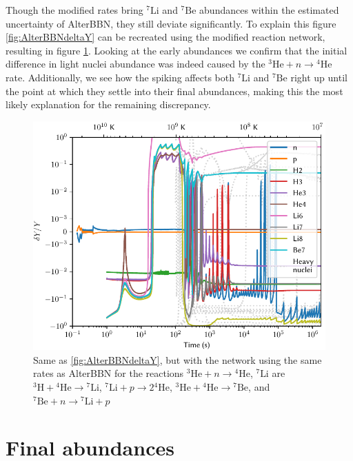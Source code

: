 Though the modified rates bring ${}^7\text{Li}$ and ${}^7\text{Be}$ abundances within the estimated uncertainty of AlterBBN, they still deviate significantly. To explain this figure \ref{fig:AlterBBNdeltaY} can be recreated using the modified reaction network, resulting in figure \ref{fig:AlterratesBBNdeltaY}. Looking at the early abundances we confirm that the initial difference in light nuclei abundance was indeed caused by the ${}^3\text{He}+n\rightarrow {}^4\text{He}$ rate. Additionally, we see how the spiking affects both ${}^7\text{Li}$ and ${}^7\text{Be}$ right up until the point at which they settle into their final abundances, making this the most likely explanation for the remaining discrepancy.

\begin{figure}[ht]
    \includegraphics[width=5.1in]{figures/AlterratesBBNdeltaY.pdf}
    \caption{Same as \cref{fig:AlterBBNdeltaY}, but with the network using the same rates as AlterBBN for the reactions ${}^3\text{He}+n\rightarrow {}^4\text{He}$, ${}^7\text{Li}$ are ${}^3\text{H}+{}^4\text{He}\rightarrow {}^7\text{Li}$, ${}^7\text{Li} + p\rightarrow 2{}^4\text{He}$, ${}^3\text{He}+{}^4\text{He}\rightarrow {}^7\text{Be}$, and ${}^7\text{Be} + n\rightarrow {}^7\text{Li} + p$}
    \label{fig:AlterratesBBNdeltaY}
\end{figure}



\section{Final abundances}


